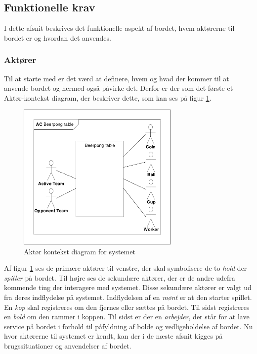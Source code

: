 \documentclass[Rapport/Rapport_main.tex]{subfiles}
\begin{document}
\subsection{Funktionelle krav}
I dette afsnit beskrives det funktionelle aspekt af bordet, hvem aktørerne til bordet er og hvordan det anvendes.
\subsubsection{Aktører}
Til at starte med er det værd at definere, hvem og hvad der kommer til at anvende bordet og hermed også påvirke det. Derfor er der som det første et Aktør-kontekst diagram, der beskriver dette, som kan ses på figur \ref{fig:rap_actor_context}.
\begin{figure}[H]
    \centering
    \includegraphics[width=0.7\textwidth,trim={0.24in 0.24in 0.24in 0.24in},clip, page=1]{Kravspecifikation/Funktionelle_krav/graphics_funktionel/Krav-spec-diagrammer.pdf}
    \caption{Aktør kontekst diagram for systemet}
    \label{fig:rap_actor_context}
\end{figure}
Af figur \ref{fig:rap_actor_context} ses de primære aktører til venstre, der skal symbolisere de to \textit{hold} der \textit{spiller} på bordet. Til højre ses de sekundære aktører, der er de andre udefra kommende ting der interagere med systemet. Disse sekundære aktører er valgt ud fra deres indflydelse på systemet. Indflydelsen af en \textit{mønt} er at den starter spillet. En \textit{kop} skal registreres om den fjernes eller sættes på bordet. Til sidst registreres en \textit{bold} om den rammer i koppen. Til sidst er der en \textit{arbejder}, der står for at lave service på bordet i forhold til påfyldning af bolde og vedligeholdelse af bordet. Nu hvor aktørerne til systemet er kendt, kan der i de næste afsnit kigges på brugssituationer og anvendelser af bordet.
\end{document}
